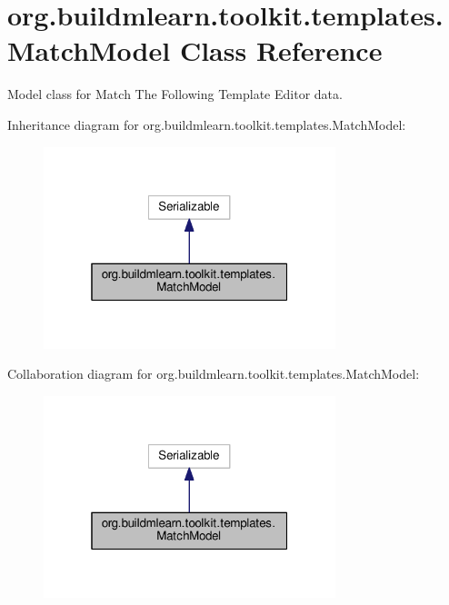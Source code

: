 \hypertarget{classorg_1_1buildmlearn_1_1toolkit_1_1templates_1_1MatchModel}{}\section{org.\+buildmlearn.\+toolkit.\+templates.\+Match\+Model Class Reference}
\label{classorg_1_1buildmlearn_1_1toolkit_1_1templates_1_1MatchModel}


Model class for Match The Following Template Editor data.  




Inheritance diagram for org.\+buildmlearn.\+toolkit.\+templates.\+Match\+Model\+:
\nopagebreak
\begin{figure}[H]
\begin{center}
\leavevmode
\includegraphics[width=241pt]{classorg_1_1buildmlearn_1_1toolkit_1_1templates_1_1MatchModel__inherit__graph}
\end{center}
\end{figure}


Collaboration diagram for org.\+buildmlearn.\+toolkit.\+templates.\+Match\+Model\+:
\nopagebreak
\begin{figure}[H]
\begin{center}
\leavevmode
\includegraphics[width=241pt]{classorg_1_1buildmlearn_1_1toolkit_1_1templates_1_1MatchModel__coll__graph}
\end{center}
\end{figure}
